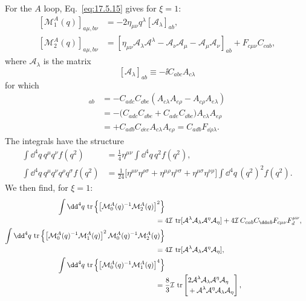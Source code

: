 For the $A$ loop, Eq.~\eqref{eq:17.5.15} gives for $\xi=1$:
\begin{align*}
\left[\mathcal M_1^A(q)\right]_{a\mu,b\nu}
&=-2\eta_{\mu\nu}q^\lambda[\mathcal A_\lambda]_{ab},\\
\left[\mathcal M_2^A(q)\right]_{a\mu,b\nu}
&=\left[\eta_{\mu\nu}\mathcal A_\lambda\mathcal A^\lambda
-\mathcal A_\nu\mathcal A_\mu-\mathcal A_\mu\mathcal A_\nu\right]_{ab}
+F_{c\mu\nu}C_{cab},
\end{align*}
where $\mathcal A_\lambda$ is the matrix
\[
[\mathcal A_\lambda]_{ab}\equiv-\ii C_{abc}A_{c\lambda}
\]
for which
\begin{align*}
[\mathcal A_\lambda,\mathcal A_\rho]_{ab}
&=-C_{adc}C_{\dd be}
(A_{c\lambda}A_{e\rho}-A_{c\rho}A_{e\lambda})\\
&=-\bigl(C_{adc}C_{\dd be}
+C_{ade}C_{\dd bc}\bigr)
A_{c\lambda}A_{e\rho}\\
&=+C_{adb}C_{\dd ec}
A_{c\lambda}A_{e\rho}
=C_{adb}F_{\dd\rho\lambda}.
\end{align*}
The integrals have the structure
\begin{align*}
\int \dd^4q\,q^\mu q^\nu f(q^2)
&=\frac14\eta^{\mu\nu}\int \dd^4q\,q^2f(q^2),\\
\int \dd^4q\,q^\mu q^\nu q^\rho q^\sigma f(q^2)
&=\frac1{24}\bigl[\eta^{\mu\nu}\eta^{\rho\sigma}
+\eta^{\mu\rho}\eta^{\nu\sigma}
+\eta^{\mu\sigma}\eta^{\nu\rho}\bigr]
\int \dd^4q\,(q^2)^2f(q^2).
\end{align*}
We then find, for $\xi=1$:
\begin{align*}
\int \dd^4q\,\operatorname{tr}\left\{
\left[\mathcal M_0^A(q)^{-1}\mathcal M_2^A(q)\right]^2\right\}
\notag\\[-2pt]
={}&4\mathcal I\,\operatorname{tr}
[\mathcal A^\lambda\mathcal A_\lambda\mathcal A^\eta\mathcal A_\eta]
+4\mathcal I\,C_{cab}C_{\dd ab}
F_{c\mu\nu}F_d^{\mu\nu},\\
\int \dd^4q\,\operatorname{tr}\left\{
\left[\mathcal M_0^A(q)^{-1}\mathcal M_1^A(q)\right]^2
\mathcal M_0^A(q)^{-1}\mathcal M_2^A(q)\right\}
\notag\\[-2pt]
={}&4\mathcal I\,\operatorname{tr}
[\mathcal A^\lambda\mathcal A_\lambda\mathcal A^\eta\mathcal A_\eta],\\
\int \dd^4q\,\operatorname{tr}\left\{
\left[\mathcal M_0^A(q)^{-1}\mathcal M_1^A(q)\right]^4\right\}
\notag\\[-2pt]
={}&\frac83\mathcal I\,\operatorname{tr}
\left[\begin{aligned}
&2\mathcal A^\lambda\mathcal A_\lambda\mathcal A^\eta\mathcal A_\eta\\[-2pt]
&+\mathcal A^\lambda\mathcal A^\eta\mathcal A_\lambda\mathcal A_\eta
\end{aligned}\right],
\end{align*}
